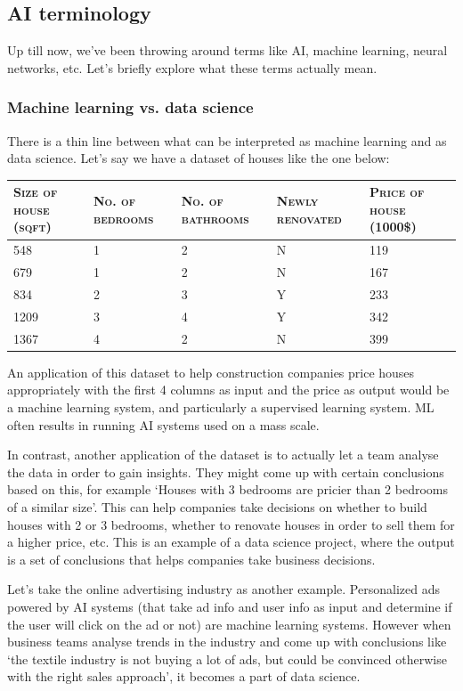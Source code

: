 \documentclass{article}[a4paper,12pt]
\theoremstyle{definition}
\begin{document}
\subsection{AI terminology}
Up till now, we've been throwing around terms like AI, machine learning, neural networks, etc. Let's briefly explore what these terms actually mean.
\subsubsection{Machine learning vs. data science}
There is a thin line between what can be interpreted as machine learning and as data science. Let's say we have a dataset of houses like the one below:
\begin{center}
\begin{tabular}{|p{7em}|p{6em}|p{6em}|p{6em}|p{8em}|}
\hline
\textsc{Size of house (sqft)} & \textsc{No. of bedrooms} & \textsc{No. of bathrooms} & \textsc{Newly renovated} & \textsc{Price of house} (1000\$)\\
\hline
548 & 1 & 2 & N & 119\\
\hline
679 & 1 & 2 & N & 167\\
\hline
834 & 2 & 3 & Y & 233\\
\hline
1209 & 3 & 4 & Y & 342\\
\hline
1367 & 4 & 2 & N & 399\\
\hline
\end{tabular}
\end{center}
An application of this dataset to help construction companies price  houses appropriately with the first 4 columns as input and the price as output would be a machine learning system, and particularly a supervised learning system. ML often results in running AI systems used on a mass scale.
\vspace{6pt}

In contrast, another application of the dataset is to actually let a team analyse the data in order to gain insights. They might come up with certain conclusions based on this, for example `Houses with 3 bedrooms are pricier than 2 bedrooms of a similar size'. This can help companies take decisions on whether to build houses with 2 or 3 bedrooms, whether to renovate houses in order to sell them for a higher price, etc. This is an example of a data science project, where the output is a set of conclusions that helps companies take business decisions.
\vspace{6pt}

Let's take the online advertising industry as another example. Personalized ads powered by AI systems (that take ad info and user info as input and determine if the user will click on the ad or not) are machine learning systems. However when business teams analyse trends in the industry and come up with conclusions like `the textile industry is not buying a lot of ads, but could be convinced otherwise with the right sales approach', it becomes a part of data science.
\end{document}
